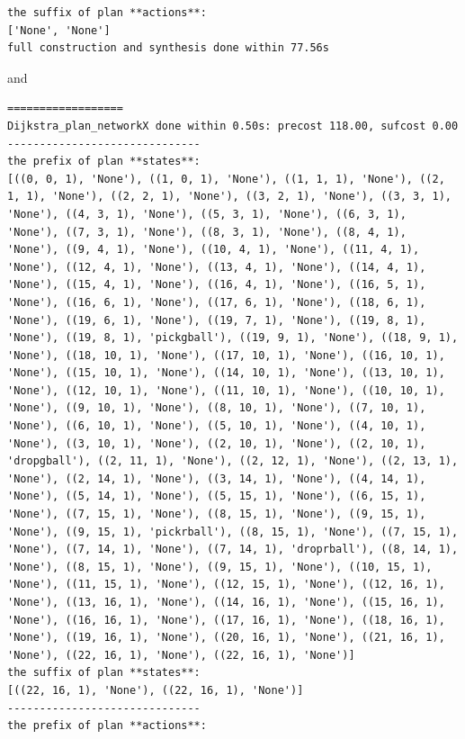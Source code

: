 \begin{lstlisting}
the suffix of plan **actions**:
['None', 'None']
full construction and synthesis done within 77.56s 
\end{lstlisting}
and
\begin{lstlisting}
==================
Dijkstra_plan_networkX done within 0.50s: precost 118.00, sufcost 0.00
------------------------------
the prefix of plan **states**:
[((0, 0, 1), 'None'), ((1, 0, 1), 'None'), ((1, 1, 1), 'None'), ((2, 1, 1), 'None'), ((2, 2, 1), 'None'), ((3, 2, 1), 'None'), ((3, 3, 1), 'None'), ((4, 3, 1), 'None'), ((5, 3, 1), 'None'), ((6, 3, 1), 'None'), ((7, 3, 1), 'None'), ((8, 3, 1), 'None'), ((8, 4, 1), 'None'), ((9, 4, 1), 'None'), ((10, 4, 1), 'None'), ((11, 4, 1), 'None'), ((12, 4, 1), 'None'), ((13, 4, 1), 'None'), ((14, 4, 1), 'None'), ((15, 4, 1), 'None'), ((16, 4, 1), 'None'), ((16, 5, 1), 'None'), ((16, 6, 1), 'None'), ((17, 6, 1), 'None'), ((18, 6, 1), 'None'), ((19, 6, 1), 'None'), ((19, 7, 1), 'None'), ((19, 8, 1), 'None'), ((19, 8, 1), 'pickgball'), ((19, 9, 1), 'None'), ((18, 9, 1), 'None'), ((18, 10, 1), 'None'), ((17, 10, 1), 'None'), ((16, 10, 1), 'None'), ((15, 10, 1), 'None'), ((14, 10, 1), 'None'), ((13, 10, 1), 'None'), ((12, 10, 1), 'None'), ((11, 10, 1), 'None'), ((10, 10, 1), 'None'), ((9, 10, 1), 'None'), ((8, 10, 1), 'None'), ((7, 10, 1), 'None'), ((6, 10, 1), 'None'), ((5, 10, 1), 'None'), ((4, 10, 1), 'None'), ((3, 10, 1), 'None'), ((2, 10, 1), 'None'), ((2, 10, 1), 'dropgball'), ((2, 11, 1), 'None'), ((2, 12, 1), 'None'), ((2, 13, 1), 'None'), ((2, 14, 1), 'None'), ((3, 14, 1), 'None'), ((4, 14, 1), 'None'), ((5, 14, 1), 'None'), ((5, 15, 1), 'None'), ((6, 15, 1), 'None'), ((7, 15, 1), 'None'), ((8, 15, 1), 'None'), ((9, 15, 1), 'None'), ((9, 15, 1), 'pickrball'), ((8, 15, 1), 'None'), ((7, 15, 1), 'None'), ((7, 14, 1), 'None'), ((7, 14, 1), 'droprball'), ((8, 14, 1), 'None'), ((8, 15, 1), 'None'), ((9, 15, 1), 'None'), ((10, 15, 1), 'None'), ((11, 15, 1), 'None'), ((12, 15, 1), 'None'), ((12, 16, 1), 'None'), ((13, 16, 1), 'None'), ((14, 16, 1), 'None'), ((15, 16, 1), 'None'), ((16, 16, 1), 'None'), ((17, 16, 1), 'None'), ((18, 16, 1), 'None'), ((19, 16, 1), 'None'), ((20, 16, 1), 'None'), ((21, 16, 1), 'None'), ((22, 16, 1), 'None'), ((22, 16, 1), 'None')]
the suffix of plan **states**:
[((22, 16, 1), 'None'), ((22, 16, 1), 'None')]
------------------------------
the prefix of plan **actions**:

\end{lstlisting}
